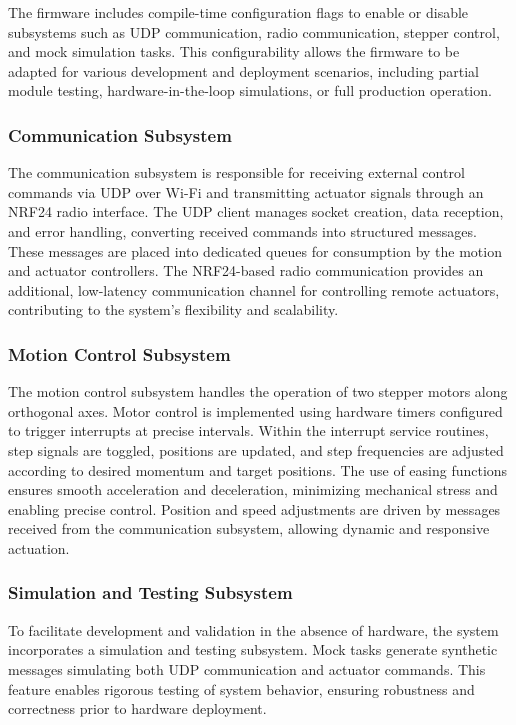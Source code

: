 The firmware includes compile-time configuration flags to enable or disable subsystems such as UDP communication, radio communication, stepper control, and mock simulation tasks. This configurability allows the firmware to be adapted for various development and deployment scenarios, including partial module testing, hardware-in-the-loop simulations, or full production operation.

\subsubsection{Communication Subsystem}
The communication subsystem is responsible for receiving external control commands via UDP over Wi-Fi and transmitting actuator signals through an NRF24 radio interface. The UDP client manages socket creation, data reception, and error handling, converting received commands into structured messages. These messages are placed into dedicated queues for consumption by the motion and actuator controllers. The NRF24-based radio communication provides an additional, low-latency communication channel for controlling remote actuators, contributing to the system's flexibility and scalability.

\subsubsection{Motion Control Subsystem}
The motion control subsystem handles the operation of two stepper motors along orthogonal axes. Motor control is implemented using hardware timers configured to trigger interrupts at precise intervals. Within the interrupt service routines, step signals are toggled, positions are updated, and step frequencies are adjusted according to desired momentum and target positions. The use of easing functions ensures smooth acceleration and deceleration, minimizing mechanical stress and enabling precise control. Position and speed adjustments are driven by messages received from the communication subsystem, allowing dynamic and responsive actuation.

\subsubsection{Simulation and Testing Subsystem}
To facilitate development and validation in the absence of hardware, the system incorporates a simulation and testing subsystem. Mock tasks generate synthetic messages simulating both UDP communication and actuator commands. This feature enables rigorous testing of system behavior, ensuring robustness and correctness prior to hardware deployment.

